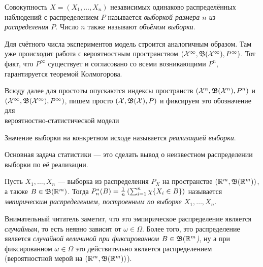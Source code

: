 \begin{definition}
	Совокупность $X = (X_1, \ldots, X_n)$ независимых одинаково распределённых наблюдений с распределением $P$ называется \textit{выборкой размера $n$ из распределения $P$}. Число $n$ также называют \textit{объёмом выборки}.
\end{definition}

\begin{note}
	Для счётного числа экспериментов модель строится аналогичным образом. Там уже происходит работа с вероятностным пространством $(\mathcal{X}^\infty, \mathfrak{B}(\mathcal{X}^\infty), P^\infty)$. Тот факт, что $P^\infty$ существует и согласовано со всеми возникающими $P^n$, гарантируется теоремой Колмогорова.
\end{note}

\begin{note}
	Всюду далее для простоты опускаются индексы пространств $(\mathcal{X}^n, \mathfrak{B}(\mathcal{X}^n), P^n)$ и $(\mathcal{X}^\infty, \mathfrak{B}(\mathcal{X}^\infty), P^\infty)$, пишем просто $(\mathcal{X}, \mathfrak{B}(\mathcal{X}), P)$ и фиксируем это обозначение для \\ вероятностно-статистической модели
\end{note}

\begin{definition}
	Значение выборки на конкретном исходе называется \textit{реализацией выборки}.
\end{definition}

\begin{note}
	Основная задача статистики --- это сделать вывод о неизвестном распределении выборки по её реализации.
\end{note}

\begin{definition}
	Пусть $X_1, \ldots, X_n$ --- выборка из распределения $P_X$ на пространстве $(\mathbb{R}^m, \mathfrak{B}(\mathbb{R}^m))$, а также $B \in \mathfrak{B}(\mathbb{R}^m)$. Тогда $P_n^*(B) = \frac{1}{n}\left(\sum_{i = 1}^n \chi\{X_i \in B\}\right)$ называется \textit{эмпирическим распределением, построенным по выборке $X_1, \ldots, X_n$}.
\end{definition}

\begin{note}
	Внимательный читатель заметит, что это эмпирическое распределение является \textit{случайным}, то есть неявно зависит от $\omega \in \Omega$. Более того, это распределение является \textit{случайной величиной при фиксированном $B \in \mathfrak{B}(\mathbb{R}^m$)}, ну а при фиксированном $\omega \in \Omega$ это действительно является распределением (вероятностной мерой на $(\mathbb{R}^m, \mathfrak{B}(\mathbb{R}^m))$).
\end{note}

